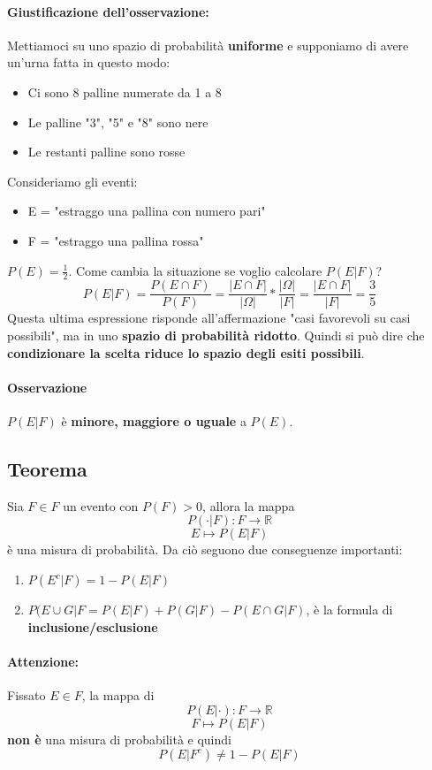 \documentclass{report}
\begin{document}
\paragraph{Giustificazione dell'osservazione:} Mettiamoci su uno spazio di probabilità \textbf{uniforme} e supponiamo di avere un'urna fatta in questo modo: \begin{itemize}
    \item Ci sono 8 palline numerate da 1 a 8
    \item Le palline "3", "5" e "8" sono nere
    \item Le restanti palline sono rosse
\end{itemize}
Consideriamo gli eventi: \begin{itemize}
    \item E = "estraggo una pallina con numero pari"
    \item F = "estraggo una pallina rossa"
\end{itemize}
\(P(E) = \frac{1}{2}\). Come cambia la situazione se voglio calcolare \(P(E|F)\)? \[P(E|F) = \frac{P(E \cap F)}{P(F)} = \frac{|E \cap F|}{|\Omega|}*\frac{|\Omega|}{|F|} = \frac{|E \cap F|}{|F|} = \frac{3}{5}\] Questa ultima espressione risponde all'affermazione "casi favorevoli su casi possibili", ma in uno \textbf{spazio di probabilità ridotto}. Quindi si può dire che \textbf{condizionare la scelta riduce lo spazio degli esiti possibili}.
\paragraph{Osservazione} \(P(E|F)\) è \textbf{minore, maggiore o uguale} a \(P(E)\).
\subsection{Teorema}
Sia \(F \in \textit{F}\) un evento con \(P(F) > 0\), allora la mappa \[P(\cdot |F): \textit{F} \xrightarrow{} \mathbb{R}\] \[E \longmapsto P(E|F)\] è una misura di probabilità. Da ciò seguono due conseguenze importanti: \begin{enumerate}
    \item \(P(E^c|F) = 1- P(E|F)\)
    \item \(P(E \cup G|F = P(E|F) + P(G|F) - P(E \cap G|F)\), è la formula di \textbf{inclusione/esclusione}
\end{enumerate}
\paragraph{Attenzione:} Fissato \(E \in \textit{F}\), la mappa di \[P(E|\cdot ): \textit{F} \xrightarrow{} \mathbb{R}\] \[F \longmapsto P(E|F)\] \textbf{non è} una misura di probabilità e quindi \[P(E|F^c) \neq 1 - P(E|F)\]
\end{document}
